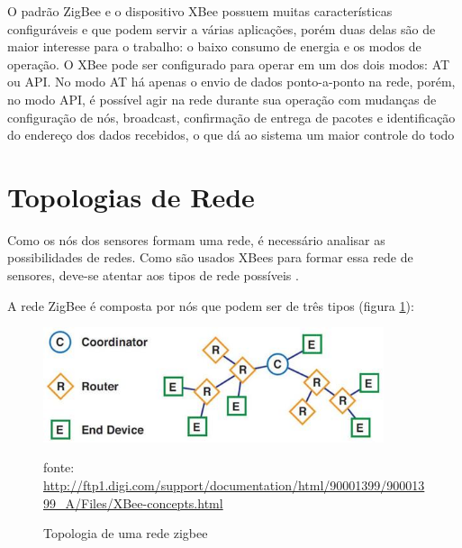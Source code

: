  O padrão ZigBee e o dispositivo XBee possuem muitas características configuráveis e que podem servir a várias aplicações\cite{xbee_book}, porém duas delas são de maior interesse para o trabalho: o baixo consumo de energia e os modos de operação. O XBee pode ser configurado para operar em um dos dois modos: AT ou API. No modo AT há apenas o envio de dados ponto-a-ponto na rede, porém, no modo API, é possível agir na rede durante sua operação com mudanças de configuração de nós, broadcast, confirmação de entrega de pacotes e identificação do endereço dos dados recebidos, o que dá ao sistema um maior controle do todo \cite{xbee_documentation}
 
\section{Topologias de Rede}
\label{Sec:Redes_topologias}
 Como os nós dos sensores formam uma rede, é necessário analisar as possibilidades de redes. Como são usados XBees para formar essa rede de sensores, deve-se atentar aos tipos de rede possíveis \cite{xbee_book} \cite{xbee_documentation}.
 
 A rede ZigBee é composta por nós que podem ser de três tipos (figura \ref{fig:zigbee_network}):

  \begin{figure}[H]
  \centering
  \includegraphics[width=10cm,keepaspectratio]{figuras/zigbee_network_topology.jpg}
  \caption{\label{fig:zigbee_network} Topologia de uma rede zigbee}
  fonte: \url{http://ftp1.digi.com/support/documentation/html/90001399/90001399_A/Files/XBee-concepts.html}
  \end{figure}

